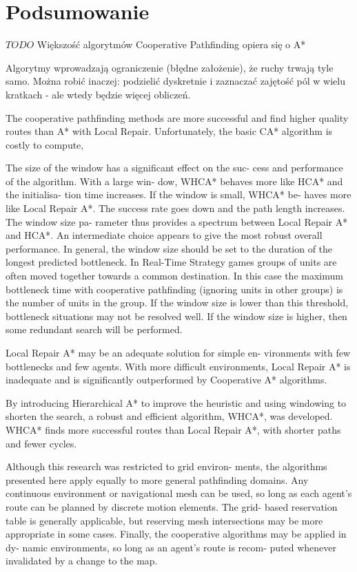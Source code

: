 \chapter{Podsumowanie}
\label{ch:podsumowanie}

$TODO$
Większość algorytmów Cooperative Pathfinding opiera się o A*

Algorytmy wprowadzają ograniczenie (błędne założenie), że ruchy trwają tyle samo. Można robić inaczej: podzielić dyskretnie i zaznaczać zajętość pól w wielu kratkach - ale wtedy będzie więcej obliczeń.

The cooperative pathfinding methods are more successful
and find higher quality routes than A* with Local Repair.
Unfortunately, the basic CA* algorithm is costly to compute,

The size of the window has a significant effect on the suc-
cess and performance of the algorithm. With a large win-
dow, WHCA* behaves more like HCA* and the initialisa-
tion time increases. If the window is small, WHCA* be-
haves more like Local Repair A*. The success rate goes
down and the path length increases. The window size pa-
rameter thus provides a spectrum between Local Repair A*
and HCA*. An intermediate choice appears to give the most robust overall performance.
In general, the window size should be set to the duration
of the longest predicted bottleneck. In Real-Time Strategy
games groups of units are often moved together towards a
common destination. In this case the maximum bottleneck
time with cooperative pathfinding (ignoring units in other
groups) is the number of units in the group. If the window
size is lower than this threshold, bottleneck situations may
not be resolved well. If the window size is higher, then some
redundant search will be performed.

Local Repair A* may be an adequate solution for simple en-
vironments with few bottlenecks and few agents. With more
difficult environments, Local Repair A* is inadequate and is
significantly outperformed by Cooperative A* algorithms.

By introducing Hierarchical A* to improve the heuristic and
using windowing to shorten the search, a robust and efficient
algorithm, WHCA*, was developed. WHCA* finds more
successful routes than Local Repair A*, with shorter paths
and fewer cycles.

Although this research was restricted to grid environ-
ments, the algorithms presented here apply equally to more
general pathfinding domains. Any continuous environment
or navigational mesh can be used, so long as each agent’s
route can be planned by discrete motion elements. The grid-
based reservation table is generally applicable, but reserving
mesh intersections may be more appropriate in some cases.
Finally, the cooperative algorithms may be applied in dy-
namic environments, so long as an agent’s route is recom-
puted whenever invalidated by a change to the map.


